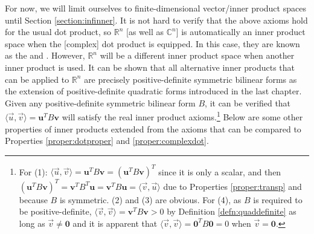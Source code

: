 For now, we will limit ourselves to finite-dimensional vector/inner product spaces until Section \ref{section:infinner}. It is not hard to verify that the above axioms hold for the usual dot product, so $\mathbb{R}^n$ [as well as $\mathbb{C}^n$] is automatically an inner product space when the [complex] dot product is equipped. In this case, they are known as the  and . However, $\mathbb{R}^n$ will be a different inner product space when another inner product is used. It can be shown that all alternative inner products that can be applied to $\mathbb{R}^n$ are precisely positive-definite symmetric bilinear forms as the extension of positive-definite quadratic forms introduced in the last chapter. Given any positive-definite symmetric bilinear form $B$, it can be verified that $\langle \vec{u}, \vec{v} \rangle = \textbf{u}^TB\textbf{v}$ will satisfy the real inner product axioms.\footnote{For (1): $\langle \vec{u}, \vec{v} \rangle = \textbf{u}^TB\textbf{v} = (\textbf{u}^TB\textbf{v})^T$ since it is only a scalar, and then $(\textbf{u}^TB\textbf{v})^T = \textbf{v}^TB^T\textbf{u} = \textbf{v}^TB\textbf{u} = \langle \vec{v}, \vec{u} \rangle$ due to Properties \ref{proper:transp} and because $B$ is symmetric. (2) and (3) are obvious. For (4), as $B$ is required to be positive-definite, $\langle \vec{v}, \vec{v} \rangle = \textbf{v}^TB\textbf{v} > 0$ by Definition \ref{defn:quaddefinite} as long as $\vec{v} \neq \textbf{0}$ and it is apparent that $\langle \vec{v}, \vec{v} \rangle = \textbf{0}^TB\textbf{0} = 0$ when $\vec{v} = \textbf{0}$.} Below are some other properties of inner products extended from the axioms that can be compared to Properties \ref{proper:dotproper} and \ref{proper:complexdot}.
